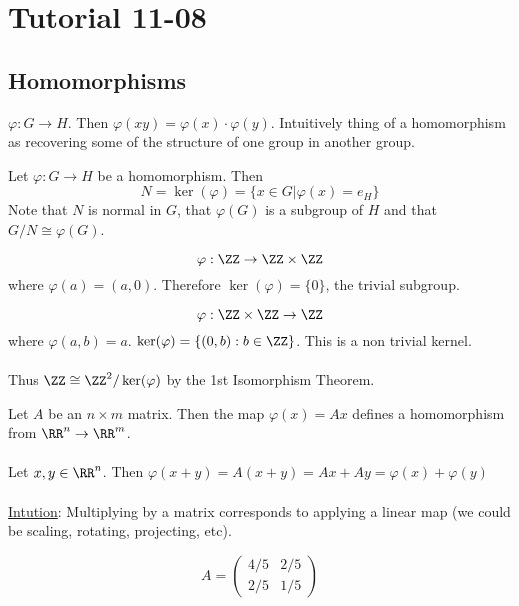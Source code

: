 \documentclass[class=scrartcl, crop=false]{standalone}
\date{2019-11-08}
\begin{document}
\section{Tutorial 11-08}

\subsection{Homomorphisms}

$\varphi:G\to H$. Then $\varphi(xy) = \varphi(x)\cdot\varphi(y)$. Intuitively thing of a homomorphism as recovering some of the structure of one group in another group.

\begin{theorem}
  Let $\varphi: G \to H$ be a homomorphism. Then 
  \[
    N = \ker(\varphi) = \{x \in G | \varphi(x) = e_H\}
  \]
  Note that $N$ is normal in $G$, that $\varphi(G)$ is a subgroup of $H$ and that $G / N \cong \varphi(G)$.
\end{theorem} 
\begin{example}
  \[
    \varphi:\ZZ \to \ZZ \times \ZZ
  \]
  where $\varphi(a) = (a, 0)$. Therefore $\ker(\varphi) = \{0\}$, the trivial subgroup.
\end{example} 
\begin{example}
  \[
    \varphi:\ZZ \times \ZZ \to \ZZ
  \]
  where $\varphi(a, b) = a$. $\ker(\varphi) = \{(0, b) : b \in \ZZ\}$. This is a non trivial kernel.
  \\\\
  Thus $\ZZ \cong \ZZ^2 / \ker(\varphi)$ by the 1st Isomorphism Theorem.
\end{example} 
\begin{exercise}
  Let $A$ be an $n \times m$ matrix. Then the map $\varphi(x) = Ax$ defines a homomorphism from $\RR^n \to \RR^m$.
  \\\\
  Let $x, y \in \RR^n$. Then $\varphi(x + y) = A(x + y) = Ax + Ay = \varphi(x) + \varphi(y)$ 
  \\\\
  \ul{Intution}: Multiplying by a matrix corresponds to applying a linear map (we could be scaling, rotating, projecting, etc).
\end{exercise} 
\begin{example}
  \[
    A = 
    \begin{pmatrix}
      4 / 5 & 2 / 5 \\
      2 / 5 & 1 / 5
    \end{pmatrix} 
  \]
\end{example} 
\end{document}
